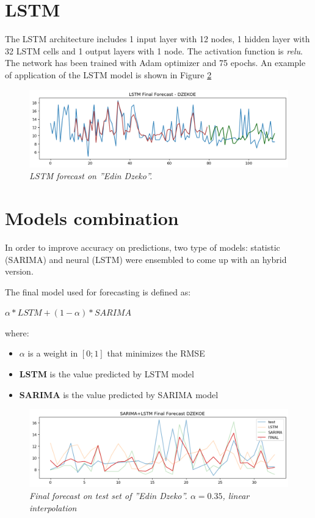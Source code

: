 \section{LSTM}
The LSTM architecture includes 1 input layer with 12 nodes, 1 hidden layer with 32 LSTM cells and 1 output layers with 1 node. The activation function is \textit{relu}.
The network has been trained with Adam optimizer and 75 epochs.
An example of application of the LSTM model is shown in Figure \ref{fig:mlp}
\begin{figure}[H]
  \includegraphics[scale=0.5]{images/dzeko_lstm_forecast.png}
   \centering  
   \caption{\textit{LSTM forecast on ''Edin Dzeko''.}}
  \label{fig:mlp}
\end{figure}


\section{Models combination}

In order to improve accuracy  on predictions, two type of models: statistic (SARIMA) and neural (LSTM)  were ensembled to come up with an hybrid version.

The final model used for forecasting is defined as:
\\
\begin{center}
  $\alpha * LSTM + (1 - \alpha) * SARIMA$
\end{center}
where:
\begin{itemize}
    \item \textbf{$\alpha$} is a weight in $[0; 1]$ that minimizes the RMSE 
    \item \textbf{LSTM} is the value predicted by LSTM model
    \item \textbf{SARIMA}  is the value predicted by SARIMA model 
\end{itemize}


\begin{figure}[H]
  \includegraphics[scale=0.5]{images/dzeko_sarima_lstm_forecast.png}
   \centering  
   \caption{\textit{Final forecast on test set of ''Edin Dzeko''. $\alpha  = 0.35$, \textit{linear interpolation}}}
  \label{fig:mlp}
\end{figure}


